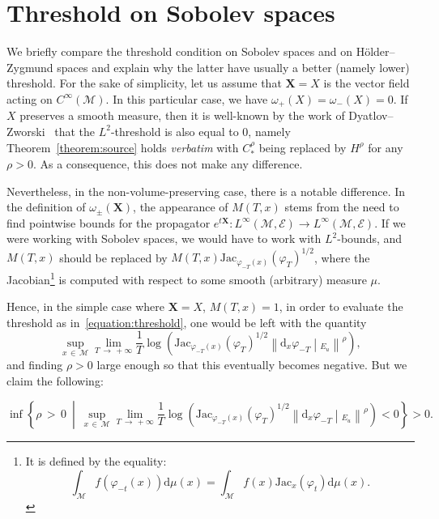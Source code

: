 \documentclass[AHL,Unicode,longabstracts,published]{cedram}
\newcommand{\X}{\mathbf{X}}
\newcommand{\mc}{\mathcal}
\newcommand{\M}{\mathcal{M}}
\newcommand{\E}{\mathcal{E}}
\newcommand{\dd}{\mathrm{d}}
\newcommand{\Jac}{\mathrm{Jac}}
\begin{document}
\section{Threshold on Sobolev spaces}
\label{appendix:b}

We briefly compare the threshold condition on Sobolev spaces and on H\"older--Zygmund spaces and explain why the latter have usually a better (namely lower) threshold. For the sake of simplicity, let us assume that $\X = X$ is the vector field acting on $C^\infty(\M)$. In this particular case, we have $\omega_+(X)=\omega_-(X)=0$. If $X$ preserves a smooth measure, then it is well-known by the work of Dyatlov--Zworski~\cite[Appendix~E]{Dyatlov-Zworski-19} that the $L^2$-threshold is also equal to $0$, namely Theorem~\ref{theorem:source} holds \emph{verbatim} with $C^\rho_*$ being replaced by $H^\rho$ for any $\rho > 0$. As a consequence, this does not make any difference.

Nevertheless, in the non-volume-preserving case, there is a notable difference. In the definition of $\omega_{\pm}(\X)$, the appearance of $M(T,x)$ stems from the need to find pointwise bounds for the propagator $e^{t\X}:L^\infty(\M,\E) \to L^\infty(\M,\E)$. If we were working with Sobolev spaces, we would have to work with $L^2$-bounds, and $M(T,x)$ should be replaced by $M(T,x) \Jac_{\varphi_{-T}(x)}(\varphi_T)^{1/2}$, where the Jacobian\footnote{It is defined by the equality:
\[
\int_{\mc{M}} f(\varphi_{-t}(x)) \dd \mu(x) = \int_{\M} f(x) \Jac_x(\varphi_t) \dd \mu(x).
\]
} is computed with respect to some smooth (arbitrary) measure $\mu$.

Hence, in the simple case where $\X = X$, $M(T,x)=1$, in order to evaluate the threshold as in~\eqref{equation:threshold}, one would be left with the quantity
\begin{equation}\label{equation:threshold-l2}
\sup_{x\,\in\,\M} \lim_{T\,\to\,+\infty} \frac{1}{T}\log \left(\Jac_{\varphi_{-T}(x)}(\varphi_T)^{1/2} \left\| \dd_x \varphi_{-T}\middle|_{E_u} \right\|^\rho\right),
\end{equation}
and finding $\rho > 0$ large enough so that this eventually becomes negative. But we claim the following:

\begin{lemm}
\[
\inf\left\{ \rho\,>\,0~\middle|~\sup_{x\,\in\,\M} \lim_{T\,\to\,+\infty} \frac{1}{T}\log \left(\Jac_{\varphi_{-T}(x)}(\varphi_T)^{1/2} \left\| \dd_x \varphi_{-T}\middle|_{E_u} \right\|^\rho\right) < 0\right\} > 0.
\]
\end{lemm}
\end{document}
